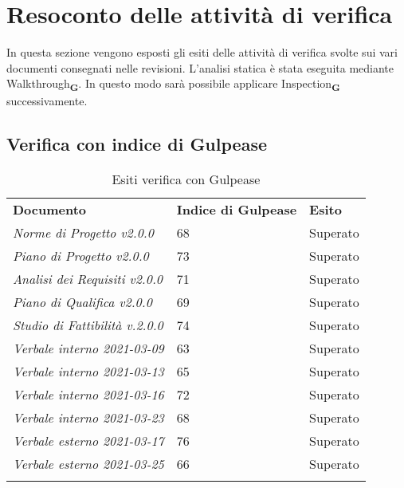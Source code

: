 \section{Resoconto delle attività di verifica}
In questa sezione vengono esposti gli esiti delle attivit\`a di verifica svolte sui vari documenti consegnati nelle revisioni.
L'analisi statica \`e stata eseguita mediante Walkthrough\textsubscript{\textbf{G}}. In questo modo sarà possibile applicare Inspection\textsubscript{\textbf{G}} successivamente.
\subsection{Verifica con indice di Gulpease}
\begin{center}
    \centering

    \renewcommand{\arraystretch}{1.8}
    \label{tab:IndiciGulpease}
    \begin{longtable}[!h]{p{150px} p{50px} p{50px}}
        \caption{Esiti verifica con Gulpease}                                                  \\
        \rowcolor{logo!70}   \textbf{Documento} & \textbf{Indice di Gulpease} & \textbf{Esito} \\
        \textit{Norme di Progetto v2.0.0}       & 68                          & Superato       \\
        \textit{Piano di Progetto v2.0.0}                & 73                          & Superato       \\
        \textit{Analisi dei Requisiti v2.0.0}            & 71                          & Superato       \\
        \textit{Piano di Qualifica v2.0.0}               & 69                          & Superato       \\
        \textit{Studio di Fattibilità v.2.0.0}           & 74                          & Superato       \\
        \textit{Verbale interno 2021-03-09}          & 63                          & Superato       \\
        \textit{Verbale interno 2021-03-13}          & 65                          & Superato       \\
        \textit{Verbale interno 2021-03-16}          & 72                          & Superato       \\
        \textit{Verbale interno 2021-03-23}          & 68                          & Superato       \\
        \textit{Verbale esterno 2021-03-17}          & 76                          & Superato       \\
        \textit{Verbale esterno 2021-03-25}          & 66                          & Superato       \\
        \rowcolor{white}
    \end{longtable}
\end{center}